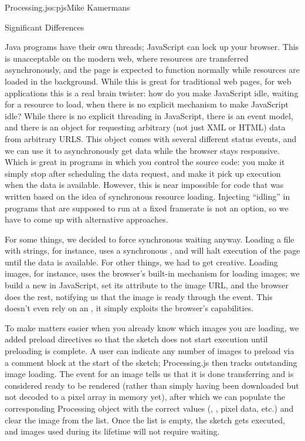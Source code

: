 \begin{aosachapter}{Processing.js}{s:pjs}{Mike Kamermans}
\begin{aosasect1}{Significant Differences}
\begin{aosasect3}{Java programs have their own threads; JavaScript can lock up your browser.}
This is unacceptable on the modern web, where resources are
transferred asynchronously, and the page is expected to function
normally while resources are loaded in the background. While this is
great for traditional web pages, for web applications this is a real
brain twister: how do you make JavaScript idle, waiting for a resource
to load, when there is no explicit mechanism to make JavaScript idle?
While there is no explicit threading in JavaScript, there is an event
model, and there is an  object for requesting arbitrary
(not just XML or HTML) data from arbitrary URLS. This object comes
with several different status events, and we can use it to
asynchronously get data while the browser stays responsive. Which is
great in programs in which you control the source code: you make it
simply stop after scheduling the data request, and make it pick up
execution when the data is available. However, this is near impossible
for code that was written based on the idea of synchronous resource
loading. Injecting ``idling'' in programs that are supposed to run at a
fixed framerate is not an option, so we have to come up with
alternative approaches.

For some things, we decided to force synchronous waiting
anyway. Loading a file with strings, for instance, uses a synchronous
, and will halt execution of the page until the data is
available. For other things, we had to get creative. Loading images,
for instance, uses the browser's built-in mechanism for loading
images; we build a new  in JavaScript, set its 
attribute to the image URL, and the browser does the rest, notifying
us that the image is ready through the  event. This
doesn't even rely on an , it simply exploits the
browser's capabilities.

To make matters easier when you already know which images you are
loading, we added preload directives so that the sketch does not start
execution until preloading is complete. A user can indicate any number
of images to preload via a comment block at the start of the sketch;
Processing.js then tracks outstanding image loading. The 
event for an image tells us that it is done transferring and is
considered ready to be rendered (rather than simply having been
downloaded but not decoded to a pixel array in memory yet), after
which we can populate the corresponding Processing 
object with the correct values (, , pixel
data, etc.) and clear the image from the list. Once the list is empty,
the sketch gets executed, and images used during its lifetime will not
require waiting.


\end{aosasect3}
\end{aosasect1}
\end{aosachapter}
